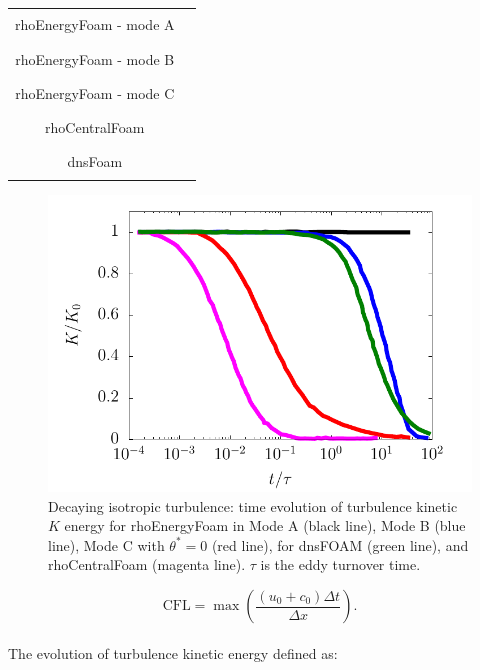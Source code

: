 \documentclass[a5paper]{sapthesis}
\begin{document}
	\begin{table}
		\centering
		\begin{tabular}{cc}
			\toprule
			rhoEnergyFoam - mode A &  \textcolor{black}{\rule{0.05\linewidth}{0.75mm}} \\
			rhoEnergyFoam - mode B &  \textcolor{blue}{\rule{0.05\linewidth}{0.75mm}} \\
			rhoEnergyFoam - mode C &  \textcolor{red}{\rule{0.05\linewidth}{0.75mm}} \\
			rhoCentralFoam	  	   &  \textcolor{magenta}{\rule{0.05\linewidth}{0.75mm}} \\
			dnsFoam			       &  \textcolor{green}{\rule{0.05\linewidth}{0.75mm}} \\
			\bottomrule
		\end{tabular}
	\end{table}
	
	\begin{figure}
		\centering
		\includegraphics[width=0.8\linewidth]{Figures/TKE_DIT}
		\caption[Turbulence kinetic energy for the decaying isotropic turbulence case]{Decaying isotropic turbulence: time evolution of turbulence kinetic $K$ energy for rhoEnergyFoam in Mode A (black line), Mode B (blue line), Mode C with $\theta^* = 0$ (red line), for dnsFOAM (green line), and rhoCentralFoam (magenta line). $\tau$ is the eddy turnover time.}
		\label{DIT}
	\end{figure} 
	
	\begin{equation}
		\text{CFL} = \max \left( \frac{(u_0 + c_0) \Delta t}{\Delta x} \right).
	\end{equation}
	\\
	The evolution of turbulence kinetic energy defined as:
	
\end{document}
